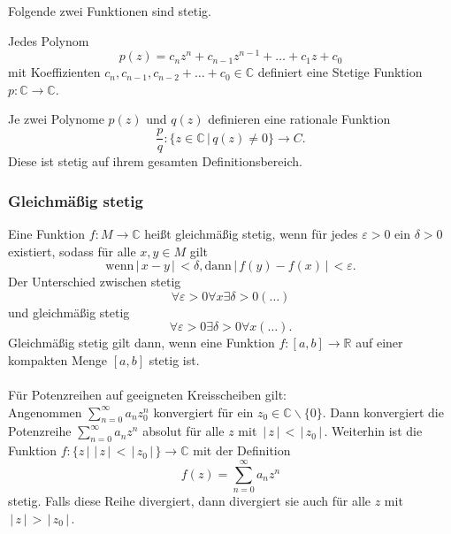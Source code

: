 \documentclass[a4paper,12pt]{article}
\begin{document}
Folgende zwei Funktionen sind stetig.
\begin{center}
        Jedes Polynom
        \[ 
                p\left(z\right)=c_nz^{n}+c _{n-1}z^{n-1}+\hdots+c_1z+c_0
        \] 
        mit Koeffizienten $c_n,c _{n-1},c _{n-2}+\hdots+c_0 \in \mathbb{C}$ definiert eine Stetige Funktion $p:\mathbb{C}\rightarrow \mathbb{C}$.
\end{center}
\begin{center}
        Je zwei Polynome $p\left(z\right)$ und $q\left(z\right)$ definieren eine rationale Funktion
        \[ 
                \dfrac{p}{q}:\{z \in \mathbb{C}\,|\, q\left(z\right)\neq 0\}\rightarrow C
        .\] 
        Diese ist stetig auf ihrem gesamten Definitionsbereich.
\end{center}

\subsubsection{Gleichmäßig stetig}
Eine Funktion $f:M\rightarrow \mathbb{C}$ heißt gleichmäßig stetig, wenn für jedes $\varepsilon >0$ ein $\delta >0$ existiert, sodass für alle $x,y \in M$ gilt
\[ 
        \text{wenn}\,|\, x-y\,|\, <\delta ,\text{dann}\,|\, f\left(y\right)-f\left(x\right)\,|\, <\varepsilon 
.\] 
Der Unterschied zwischen stetig
\[ 
        \forall \varepsilon >0\forall x \exists \delta >0\left(\hdots\right)
\] 
und gleichmäßig stetig
\[ 
        \forall \varepsilon >0\exists \delta >0\forall x\left(\hdots\right)
.\] 
Gleichmäßig stetig gilt dann, wenn eine Funktion $f:[a,b]\rightarrow \mathbb{R}$ auf einer kompakten Menge $[a,b]$ stetig ist.\\\\
Für Potenzreihen auf geeigneten Kreisscheiben gilt:\\
Angenommen $\sum_{n=0}^{\infty}a_nz^n_0$ konvergiert für ein $z_0 \in \mathbb{C}\backslash \{0\}$. Dann konvergiert die Potenzreihe $\sum_{n=0}^{\infty}a_nz^n$ absolut für alle $z$ mit $\,|\, z\,|\, <\,|\, z_0\,|\, $. Weiterhin ist die Funktion $f:\{z\,|\, \,|\, z\,|\, <\,|\, z_0\,|\, \}\rightarrow \mathbb{C}$ mit der Definition
\[ 
        f\left(z\right)=\sum_{n=0}^{\infty}a_nz^n
\] 
stetig. Falls diese Reihe divergiert, dann divergiert sie auch für alle $z$ mit $\,|\, z\,|\, >\,|\, z_0\,|\, $.
\end{document}
